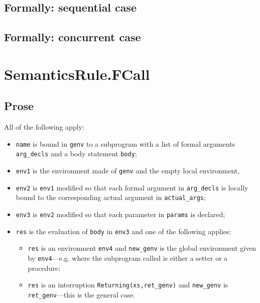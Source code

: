\documentclass{book}
\begin{document}
\begin{emptyformal}
  \subsection{Formally: sequential case}

  \subsection{Formally: concurrent case}
\end{emptyformal}


\section{SemanticsRule.FCall \label{sec:SemanticsRule.FCall}}

  \subsection{Prose}
  All of the following apply:
  \begin{itemize}
  \item \texttt{name} is bound in \texttt{genv} to a subprogram with a list of formal arguments
    \texttt{arg\_decls} and a body statement \texttt{body};
  \item \texttt{env1} is the environment made of \texttt{genv} and the empty local environment,
  \item \texttt{env2} is \texttt{env1} modified so that each formal argument in \texttt{arg\_decls} is
    locally bound to the corresponding actual argument in \texttt{actual\_args};
  \item \texttt{env3} is \texttt{env2} modified so that each parameter in \texttt{params} is declared;
  \item \texttt{res} is the evaluation of \texttt{body} in \texttt{env3} and one of the following
    applies:
      \begin{itemize}
      \item \texttt{res} is an environment \texttt{env4} and \texttt{new\_genv} is the global environment
        given by \texttt{env4}---e.g. where the subprogram called is either a setter or
        a procedure;
      \item \texttt{res} is an interruption \texttt{Returning(xs,ret\_genv)} and \texttt{new\_genv} is
        \texttt{ret\_genv}---this is the general case.
      \end{itemize}
  \end{itemize}
\end{document}
